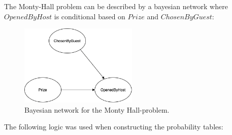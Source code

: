 \documentclass[10pt, a4paper, english]{../Template/NTNUoving}
\begin{document}
\clearpage
\begin{oppgave}
    \setcounter{Punkt}{2}
    \begin{punkt}
        The Monty-Hall problem can be described by a bayesian network where $OpenedByHost$ is conditional based on $Prize$ and $ChosenByGuest$:

        \begin{figure}[h]
            \centering
            \includegraphics[width=0.5\textwidth]{BN.png}
            \caption{Bayesian network for the Monty Hall-problem.}

            \end{figure}

        The following logic was used when constructing the probability tables:


\end{punkt}
\end{oppgave}
\end{document}
